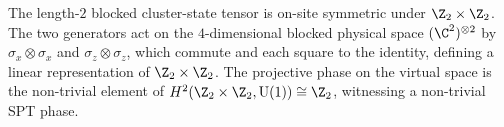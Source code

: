 \begin{theorem}\label{thm:cluster_z2z2_symmetric}
    \notready
    The length-$2$ blocked cluster-state tensor is on-site symmetric
    under $\Z_2 \times \Z_2$.  The two generators act on the
    $4$-dimensional blocked physical space $(\C^2)^{\otimes 2}$ by
    $\sigma_x \otimes \sigma_x$ and $\sigma_z \otimes \sigma_z$,
    which commute and each square to the identity, defining a linear
    representation of $\Z_2 \times \Z_2$.
    The projective phase on the virtual space is the non-trivial
    element of $H^2(\Z_2 \times \Z_2, \mathrm{U}(1)) \cong \Z_2$,
    witnessing a non-trivial SPT phase.
\end{theorem}
